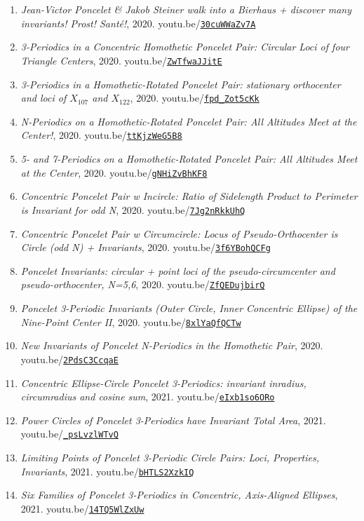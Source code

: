 \documentclass[12pt]{article}
\begin{document}
\begin{enumerate}[resume]
\item \textit{Jean-Victor Poncelet \& Jakob Steiner walk into a Bierhaus + discover many invariants! Prost! Santé!}, 2020. youtu.be/\href{https://youtu.be/30cuWWaZv7A}{\nolinkurl{30cuWWaZv7A}}
\item \textit{3-Periodics in a Concentric Homothetic Poncelet Pair: Circular Loci of four Triangle Centers}, 2020. youtu.be/\href{https://youtu.be/ZwTfwaJJitE}{\nolinkurl{ZwTfwaJJitE}}
\item \textit{3-Periodics in a Homothetic-Rotated Poncelet Pair: stationary orthocenter and loci of $X_{107}$ and $X_{122}$}, 2020. youtu.be/\href{https://youtu.be/fpd_Zot5cKk}{\nolinkurl{fpd\_Zot5cKk}}
\item \textit{N-Periodics on a Homothetic-Rotated Poncelet Pair: All Altitudes Meet at the Center!}, 2020. youtu.be/\href{https://youtu.be/ttKjzWeG5B8}{\nolinkurl{ttKjzWeG5B8}}
\item \textit{5- and 7-Periodics on a Homothetic-Rotated Poncelet Pair: All Altitudes Meet at the Center}, 2020. youtu.be/\href{https://youtu.be/gNHiZvBhKF8}{\nolinkurl{gNHiZvBhKF8}}
\item \textit{Concentric Poncelet Pair w Incircle: Ratio of Sidelength Product to Perimeter is Invariant for odd N}, 2020. youtu.be/\href{https://youtu.be/7Jg2nRkkUhQ}{\nolinkurl{7Jg2nRkkUhQ}}
\item \textit{Concentric Poncelet Pair w Circumcircle: Locus of Pseudo-Orthocenter is Circle (odd N) + Invariants}, 2020. youtu.be/\href{https://youtu.be/3f6YBohQCFg}{\nolinkurl{3f6YBohQCFg}}
\item \textit{Poncelet Invariants:
circular + point loci of the pseudo-circumcenter and pseudo-orthocenter, N=5,6}, 2020. youtu.be/\href{https://youtu.be/ZfQEDujbirQ}{\nolinkurl{ZfQEDujbirQ}}
\item \textit{Poncelet 3-Periodic Invariants (Outer Circle, Inner Concentric Ellipse) of the Nine-Point Center II}, 2020. youtu.be/\href{https://youtu.be/8xlYaQfQCTw}{\nolinkurl{8xlYaQfQCTw}}
\item \textit{New Invariants of Poncelet N-Periodics in the Homothetic Pair}, 2020. youtu.be/\href{https://youtu.be/2PdsC3CcqaE}{\nolinkurl{2PdsC3CcqaE}}
\item \textit{Concentric Ellipse-Circle Poncelet 3-Periodics: invariant inradius, circumradius and cosine sum}, 2021. youtu.be/\href{https://youtu.be/eIxb1so6ORo}{\nolinkurl{eIxb1so6ORo}}
\item \textit{Power Circles of Poncelet 3-Periodics have Invariant Total Area}, 2021. youtu.be/\href{https://youtu.be/_psLvzlWTvQ}{\nolinkurl{\_psLvzlWTvQ}}
\item \textit{Limiting Points of Poncelet 3-Periodic Circle Pairs: Loci, Properties, Invariants}, 2021. youtu.be/\href{https://youtu.be/bHTLS2XzkIQ}{\nolinkurl{bHTLS2XzkIQ}}
\item \textit{Six Families of Poncelet 3-Periodics in Concentric, Axis-Aligned Ellipses}, 2021. youtu.be/\href{https://youtu.be/14TQ5WlZxUw}{\nolinkurl{14TQ5WlZxUw}}
\end{enumerate}
\end{document}
